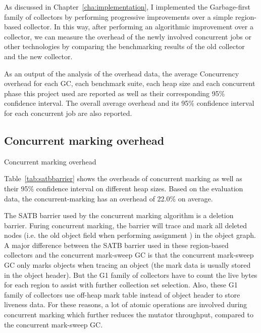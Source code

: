 As discussed in Chapter~\ref{cha:implementation}, I implemented the Garbage-first
family of collectors by performing progressive improvements over a simple region-based collector.
In this way, after performing an algorithmic improvement over a collector, we can measure the overhead of
the newly involved concurrent jobs or other technologies by comparing the benchmarking results
of the old collector and the new collector.

As an output of the analysis of the overhead data, the average Concurrency overhead
for each GC, each benchmark suite, each heap size and each concurrent phase this project used are reported
as well as their corresponding 95\% confidence interval.
The overall average overhead and its 95\% confidence interval for each concurrent job are also reported.

\subsection{Concurrent marking overhead}

\begin{table*}
  \centering
  
  \caption{Concurrent marking overhead}
  \label{tab:satbbarrier}
\end{table*}

Table~\ref{tab:satbbarrier} shows the overheads of concurrent marking
as well as their 95\% confidence interval on different heap sizes.
Based on the evaluation data, the concurrent-marking
has an overhead of 22.0\% on average.

The SATB barrier used by the concurrent marking algorithm is a deletion barrier.
Furing concurrent marking, the barrier will trace and mark
all deleted nodes (i.e. the old object field when performing assignment ) in the object graph.
A major difference between the SATB barrier used in these region-based collectors and
the concurrent mark-sweep GC is that the concurrent mark-sweep GC only marks objects
when tracing an object (the mark data is usually stored in the object header).
But the G1 family of collectors have to count the live bytes
for each region to assist with further collection set selection.
Also, these G1 family of collectors use off-heap mark table instead of object header to store
liveness data. For these reasons, a lot of atomic operations are involved during concurrent
marking which further reduces the mutator throughput, compared to the concurrent mark-sweep GC.

